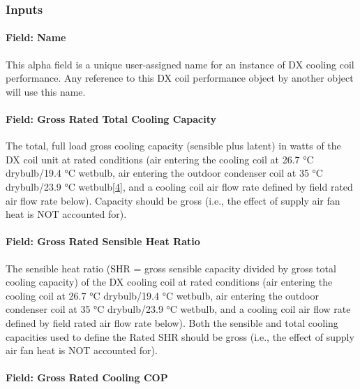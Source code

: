 \subsubsection{Inputs}\label{inputs-18-001}

\paragraph{Field: Name}\label{field-name-17-001}

This alpha field is a unique user-assigned name for an instance of DX cooling coil performance. Any reference to this DX coil performance object by another object will use this name.

\paragraph{Field: Gross Rated Total Cooling Capacity}\label{field-gross-rated-total-cooling-capacity-2}

The total, full load gross cooling capacity (sensible plus latent) in watts of the DX coil unit at rated conditions (air entering the cooling coil at 26.7 °C drybulb/19.4 °C wetbulb, air entering the outdoor condenser coil at 35 °C drybulb/23.9 °C wetbulb\protect\hyperlink{ux5fftn4}{{[}4{]}}, and a cooling coil air flow rate defined by field rated air flow rate below). Capacity should be gross (i.e., the effect of supply air fan heat is NOT accounted for).

\paragraph{Field: Gross Rated Sensible Heat Ratio}\label{field-gross-rated-sensible-heat-ratio-1}

The sensible heat ratio (SHR = gross sensible capacity divided by gross total cooling capacity) of the DX cooling coil at rated conditions (air entering the cooling coil at 26.7 °C drybulb/19.4 °C wetbulb, air entering the outdoor condenser coil at 35 °C drybulb/23.9 °C wetbulb, and a cooling coil air flow rate defined by field rated air flow rate below). Both the sensible and total cooling capacities used to define the Rated SHR should be gross (i.e., the effect of supply air fan heat is NOT accounted for).

\paragraph{Field: Gross Rated Cooling COP}\label{field-gross-rated-cooling-cop-1}

